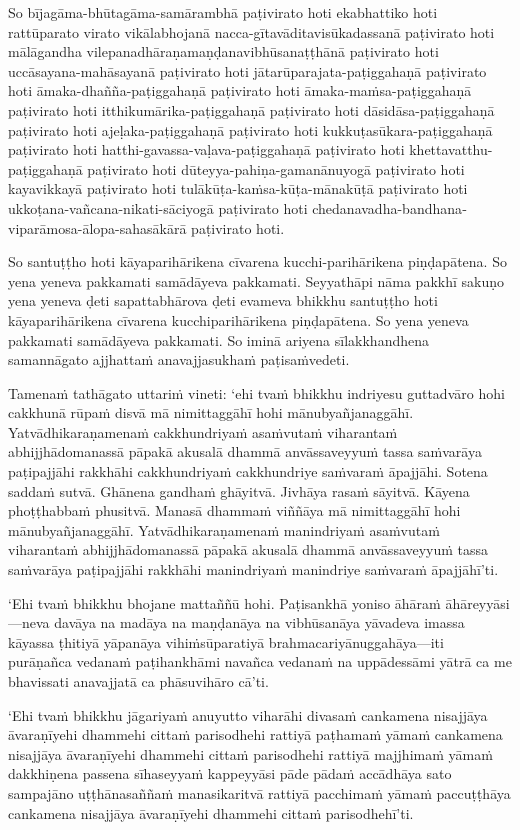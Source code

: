 So bījagāma-bhūtagāma-samārambhā paṭivirato hoti ekabhattiko hoti rattūparato virato vikālabhojanā nacca-gītavāditavisūkadassanā paṭivirato hoti mālā­gandha­ vilepana­dhāraṇa­maṇḍana­vibhūsanaṭṭhānā paṭivirato hoti uccāsayana-mahāsayanā paṭivirato hoti jātarūparajata-paṭiggahaṇā paṭivirato hoti āmaka-dhañña-paṭiggahaṇā paṭivirato hoti āmaka-maṁsa-paṭiggahaṇā paṭivirato hoti itthikumārika-paṭiggahaṇā paṭivirato hoti dāsidāsa-paṭiggahaṇā paṭivirato hoti ajeḷaka-paṭiggahaṇā paṭivirato hoti kukkuṭasūkara-paṭiggahaṇā paṭivirato hoti hatthi-gavassa-vaḷava-paṭiggahaṇā paṭivirato hoti khettavatthu-paṭiggahaṇā paṭivirato hoti dūteyya-pahiṇa-gamanānuyogā paṭivirato hoti kayavikkayā paṭivirato hoti tulākūṭa-kaṁsa-kūṭa-mānakūṭā paṭivirato hoti ukkoṭana-vañcana-nikati-sāciyogā paṭivirato hoti chedana­vadha-bandhana­ viparāmosa-ālopa-sahasākārā paṭivirato hoti.

So santuṭṭho hoti kāyaparihārikena cīvarena kucchi-parihārikena piṇḍapātena. So yena yeneva pakkamati samādāyeva pakkamati. Seyyathāpi nāma pakkhī sakuṇo yena yeneva ḍeti sapattabhārova ḍeti evameva bhikkhu santuṭṭho hoti kāyaparihārikena cīvarena kucchiparihārikena piṇḍapātena. So yena yeneva pakkamati samādāyeva pakkamati. So iminā ariyena sīlakkhandhena samannāgato ajjhattaṁ anavajjasukhaṁ paṭisaṁvedeti.

\suttaRef{[MN 51]}

Tamenaṁ tathāgato uttariṁ vineti: `ehi tvaṁ bhikkhu indriyesu guttadvāro hohi cakkhunā rūpaṁ disvā mā nimittaggāhī hohi mānubyañjanaggāhī. Yatvādhikaraṇamenaṁ cakkhundriyaṁ asaṁvutaṁ viharantaṁ abhijjhādomanassā pāpakā akusalā dhammā anvāssaveyyuṁ tassa saṁvarāya paṭipajjāhi rakkhāhi cakkhundriyaṁ cakkhundriye saṁvaraṁ āpajjāhi. Sotena saddaṁ sutvā. Ghānena gandhaṁ ghāyitvā. Jivhāya rasaṁ sāyitvā. Kāyena phoṭṭhabbaṁ phusitvā. Manasā dhammaṁ viññāya mā nimittaggāhī hohi mānubyañjanaggāhī. Yatvādhikaraṇamenaṁ manindriyaṁ asaṁvutaṁ viharantaṁ abhijjhādomanassā pāpakā akusalā dhammā anvāssaveyyuṁ tassa saṁvarāya paṭipajjāhi rakkhāhi manindriyaṁ manindriye saṁvaraṁ āpajjāhī'ti.

`Ehi tvaṁ bhikkhu bhojane mattaññū hohi. Paṭisankhā yoniso āhāraṁ āhāreyyāsi—neva davāya na madāya na maṇḍanāya na vibhūsanāya yāvadeva imassa kāyassa ṭhitiyā yāpanāya vihiṁsūparatiyā brahmacariyānuggahāya—iti purāṇañca vedanaṁ paṭihankhāmi navañca vedanaṁ na uppādessāmi yātrā ca me bhavissati anavajjatā ca phāsuvihāro cā'ti.

`Ehi tvaṁ bhikkhu jāgariyaṁ anuyutto viharāhi divasaṁ cankamena nisajjāya āvaraṇīyehi dhammehi cittaṁ parisodhehi rattiyā paṭhamaṁ yāmaṁ cankamena nisajjāya āvaraṇīyehi dhammehi cittaṁ parisodhehi rattiyā majjhimaṁ yāmaṁ dakkhiṇena passena sīhaseyyaṁ kappeyyāsi pāde pādaṁ accādhāya sato sampajāno uṭṭhānasaññaṁ manasikaritvā rattiyā pacchimaṁ yāmaṁ paccuṭṭhāya cankamena nisajjāya āvaraṇīyehi dhammehi cittaṁ parisodhehī'ti.

